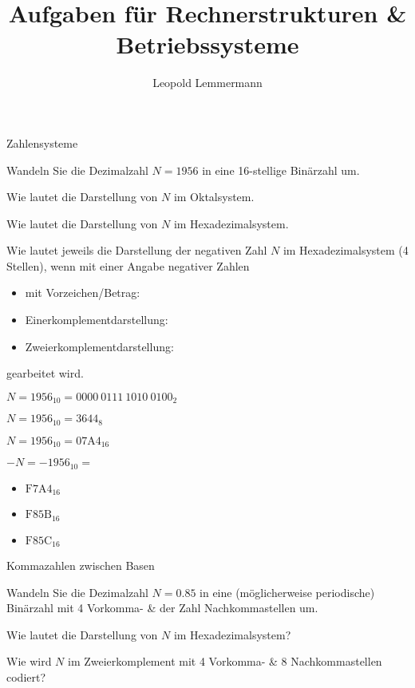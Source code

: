 \documentclass{exercisesheet}
\title{Aufgaben für Rechnerstrukturen \& Betriebssysteme}
\author{Leopold Lemmermann}
\begin{document}
\createtitle

  \begin{exercise}{Zahlensysteme}
    \item Wandeln Sie die Dezimalzahl $N = 1956$ in eine 16-stellige Binärzahl um.
    \item Wie lautet die Darstellung von $N$ im Oktalsystem.
    \item Wie lautet die Darstellung von $N$ im Hexadezimalsystem.
    \item Wie lautet jeweils die Darstellung der negativen Zahl $N$ im Hexadezimalsystem (4 Stellen), wenn mit einer Angabe negativer Zahlen
      \begin{itemize}
        \item mit Vorzeichen/Betrag:
        \item Einerkomplementdarstellung:
        \item Zweierkomplementdarstellung:
      \end{itemize}
      gearbeitet wird.
  \end{exercise}

  \begin{solution}
    \item $N = 1956_{10} = {0000\ 0111\ 1010\ 0100}_2$
    \item $N = 1956_{10} = {3644}_8$
    \item $N = 1956_{10} = {\mathrm{07A4}}_{16}$
    \item $-N = -1956_{10} = $
      \begin{itemize}
        \item ${\mathrm{F7A4}}_{16}$
        \item ${\mathrm{F85B}}_{16}$
        \item ${\mathrm{F85C}}_{16}$
      \end{itemize}
  \end{solution}

  \begin{exercise}{Kommazahlen zwischen Basen}
    \item Wandeln Sie die Dezimalzahl $N = 0.85$ in eine (möglicherweise periodische) Binärzahl mit 4 Vorkomma- \& der Zahl Nachkommastellen um.
    \item Wie lautet die Darstellung von $N$ im Hexadezimalsystem?
    \item Wie wird $N$ im Zweierkomplement mit 4 Vorkomma- \& 8 Nachkommastellen codiert?
  \end{exercise}
\end{document}
